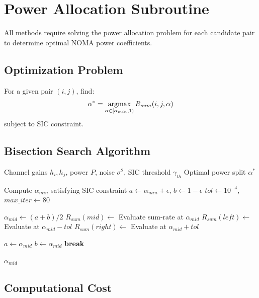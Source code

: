 \section{Power Allocation Subroutine}

All methods require solving the power allocation problem for each candidate pair to determine optimal NOMA power coefficients.

\subsection{Optimization Problem}

For a given pair $(i,j)$, find:
\begin{equation}
\alpha^* = \operatorname*{argmax}_{\alpha \in [\alpha_{min}, 1)} R_{sum}(i,j,\alpha)
\end{equation}
subject to SIC constraint.

\subsection{Bisection Search Algorithm}

\begin{algorithm}[H]
\caption{Power Allocation via Bisection}
\label{alg:power}
\begin{algorithmic}[1]
\Require Channel gains $h_i, h_j$, power $P$, noise $\sigma^2$, SIC threshold $\gamma_{th}$
\Ensure Optimal power split $\alpha^*$

\State Compute $\alpha_{min}$ satisfying SIC constraint
\State $a \gets \alpha_{min} + \epsilon$, $b \gets 1 - \epsilon$
\State $tol \gets 10^{-4}$, $max\_iter \gets 80$

    \State $\alpha_{mid} \gets (a + b) / 2$
    \State $R_{sum}(mid) \gets $ Evaluate sum-rate at $\alpha_{mid}$
    \State $R_{sum}(left) \gets $ Evaluate at $\alpha_{mid} - tol$
    \State $R_{sum}(right) \gets $ Evaluate at $\alpha_{mid} + tol$
    
        \State $a \gets \alpha_{mid}$
        \State $b \gets \alpha_{mid}$
    \Else
        \State \textbf{break} 
    \EndIf
\EndFor

\State \Return $\alpha_{mid}$
\end{algorithmic}
\end{algorithm}

\subsection{Computational Cost}

